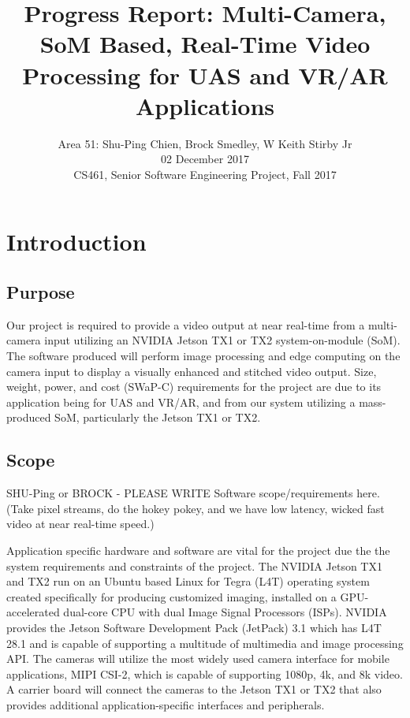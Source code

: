 \documentclass[letterpaper,10pt,serif,draftclsnofoot,onecolumn,compsoc,titlepage]{IEEEtran}
\title{Progress Report: Multi-Camera, SoM Based, Real-Time Video Processing for UAS and VR/AR Applications}
\author{Area 51: Shu-Ping Chien, Brock Smedley, W Keith Stirby Jr \\ 02 December 2017 \\ CS461, Senior Software Engineering Project, Fall 2017}
\begin{document}
\begin{titlepage}
\maketitle

\begin{abstract}


\thispagestyle{empty}
\end{abstract}
\end{titlepage}

\newpage
\tableofcontents

\newpage

\section{Introduction}

\subsection{Purpose}

Our project is required to provide a video output at near real-time from a 
multi-camera input utilizing an NVIDIA Jetson TX1 or TX2 system-on-module (SoM). 
The software produced will perform image processing and edge computing on the 
camera input to display a visually enhanced and stitched video output. 
Size, weight, power, and cost (SWaP-C) requirements for the project are due 
to its application being for UAS and VR/AR, and from our system utilizing a 
mass-produced SoM, particularly the Jetson TX1 or TX2.  

\subsection{Scope}
 
SHU-Ping or BROCK - PLEASE WRITE
Software scope/requirements here. (Take pixel streams, do the 
hokey pokey, and we have low latency, wicked fast video at near real-time speed.)
 
Application specific hardware and software are vital for the project due the the 
system requirements and constraints of the project.
The NVIDIA Jetson TX1 and TX2 run on an Ubuntu based Linux for Tegra (L4T) operating 
system created specifically for producing customized imaging, installed on a 
GPU-accelerated dual-core CPU with dual Image Signal Processors (ISPs). 
NVIDIA provides the Jetson Software Development Pack (JetPack) 3.1 which has L4T 28.1 
and is capable of supporting a multitude of multimedia and image processing API. 
The cameras will utilize the most widely used camera interface for mobile applications, 
MIPI CSI-2, which is capable of supporting 1080p, 4k, and 8k video. 
A carrier board will connect the cameras to the Jetson TX1 or TX2 that also provides 
additional application-specific interfaces and peripherals. 
\end{document}
